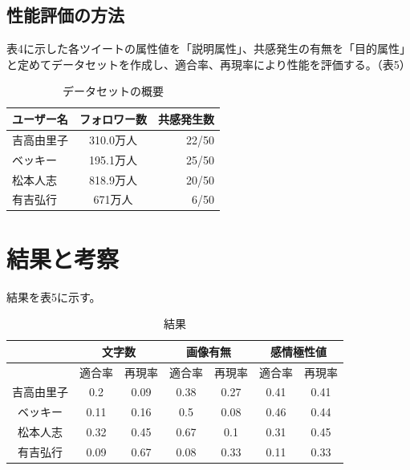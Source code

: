 \documentclass[dvipdfmx]{issj}
\begin{document}
\subsection{性能評価の方法}  %
表4に示した各ツイートの属性値を「説明属性」、共感発生の有無を「目的属性」と定めてデータセットを作成し、適合率、再現率により性能を評価する。（表5）


\begin{table}[t]
  \caption{データセットの概要}
  \label{table:data_type}
  \centering
  \begin{tabular}{lcr}
    \hline
   ユーザー名 & フォロワー数  &  共感発生数  \\
    \hline \hline
吉高由里子 & 310.0万人 &  22/50  \\
ベッキー & 195.1万人 &  25/50  \\
松本人志 & 818.9万人 &  20/50  \\
有吉弘行 & 671万人 &  6/50 \\
    \hline
  \end{tabular}
\end{table}





\section{結果と考察}  %
結果を表5に示す。


\begin{table}[t]
\centering
  \caption{結果}
  \begin{tabular}{|c|c|c|c|c|c|c|}  \hline
 &  \multicolumn{2}{|c|}{文字数} &  \multicolumn{2}{|c|}{画像有無} &  \multicolumn{2}{|c|}{感情極性値} \\ \hline \hline
&適合率 & 再現率 & 適合率 & 再現率 &適合率 & 再現率  \\ \hline
吉高由里子 & 0.2&0.09 &0.38&0.27 & 0.41&0.41 \\ \hline
ベッキー& 0.11&0.16 &0.5&0.08& 0.46&0.44 \\ \hline
松本人志& 0.32&0.45 & 0.67&0.1 &0.31&0.45 \\ \hline
有吉弘行& 0.09&0.67 & 0.08&0.33 &  0.11&0.33 \\ \hline

  \end{tabular}
\end{table}
\end{document}

